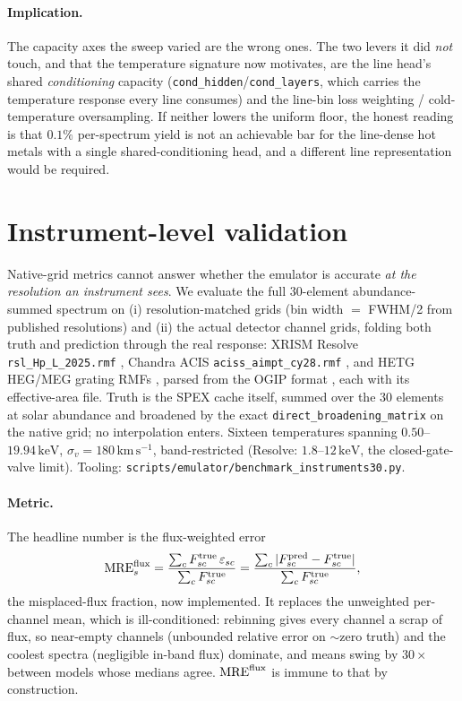 \documentclass[11pt,a4paper]{article}
\newcommand{\mre}{\mathrm{MRE}}
\newcommand{\kev}{\,\mathrm{keV}}
\newcommand{\kms}{\,\mathrm{km\,s^{-1}}}
\newcommand{\code}[1]{\texttt{#1}}
\begin{document}
\paragraph{Implication.} The capacity axes the sweep varied are the wrong ones.
The two levers it did \emph{not} touch, and that the temperature signature now
motivates, are the line head's shared \emph{conditioning} capacity
(\code{cond\_hidden}/\code{cond\_layers}, which carries the temperature response
every line consumes) and the line-bin loss weighting / cold-temperature
oversampling. If neither lowers the uniform floor, the honest reading is that
$0.1\%$ per-spectrum yield is not an achievable bar for the line-dense hot metals
with a single shared-conditioning head, and a different line representation would
be required.

\section{Instrument-level validation}
\label{sec:instruments}

Native-grid metrics cannot answer whether the emulator is accurate
\emph{at the resolution an instrument sees}. We evaluate the full
30-element abundance-summed spectrum on (i) resolution-matched grids
(bin width $=$ FWHM/2 from published resolutions) and (ii) the actual
detector channel grids, folding both truth and prediction through the
real response: XRISM Resolve \code{rsl\_Hp\_L\_2025.rmf}
\citep[$60000^2$, 93M non-zeros;][]{ishisaki25}, Chandra ACIS
\code{aciss\_aimpt\_cy28.rmf} \citep{garmire03}, and HETG HEG/MEG
grating RMFs \citep{canizares05}, parsed from the OGIP format
\citep{george07}, each with its effective-area file. Truth is the SPEX
cache itself, summed over the 30 elements at solar abundance and
broadened by the exact \code{direct\_broadening\_matrix} on the native
grid; no interpolation enters. Sixteen temperatures spanning
$0.50$--$19.94\kev$, $\sigma_v = 180\kms$, band-restricted (Resolve:
$1.8$--$12\kev$, the closed-gate-valve limit).
Tooling: \code{scripts/emulator/benchmark\_instruments30.py}.

\paragraph{Metric.} The headline number is the flux-weighted error
\begin{equation}
\mre^{\rm flux}_s
= \frac{\sum_c F^{\rm true}_{sc}\,\varepsilon_{sc}}{\sum_c F^{\rm true}_{sc}}
= \frac{\sum_c |F^{\rm pred}_{sc}-F^{\rm true}_{sc}|}{\sum_c F^{\rm true}_{sc}},
\end{equation}
the misplaced-flux fraction, now implemented. It replaces the
unweighted per-channel mean, which is ill-conditioned: rebinning gives
every channel a scrap of flux, so near-empty channels (unbounded
relative error on $\sim$zero truth) and the coolest spectra (negligible
in-band flux) dominate, and means swing by $30\times$ between models
whose medians agree. $\mre^{\rm flux}$ is immune to that by
construction.
\end{document}
